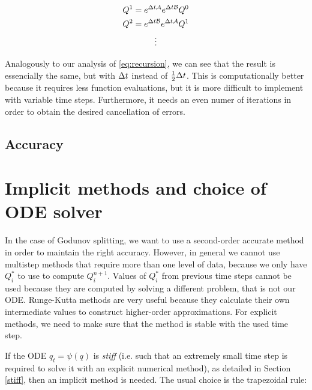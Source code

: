 \documentclass[journal,onecolumn]{IEEEtran}
\begin{document}
\begin{equation}
	\begin{gathered}
		Q^1 = e^{\Delta t\mathcal{A}}e^{\Delta t\mathcal{B}}Q^0\\
		Q^2 = e^{\Delta t\mathcal{B}}e^{\Delta t\mathcal{A}}Q^1\\
		\vdots 
	\end{gathered}
\end{equation}

Analogously to our analysis of \eqref{eq:recursion}, we can see that the result is essencially the same, but with $\Delta t$ instead of $\frac{1}{2}\Delta t$. This is computationally better because it requires less function evaluations, but it is more difficult to implement with variable time steps. Furthermore, it needs an even numer of iterations in order to obtain the desired cancellation of errors.

\subsection{Accuracy}























\section{Implicit methods and choice of ODE solver}

In the case of Godunov splitting, we want to use a second-order accurate method in order to maintain the right accuracy. However, in general we cannot use multistep methods that require more than one level of data, because we only have $Q_i^*$ to use to compute $Q_i^{n+1}$. Values of $Q_i^*$ from previous time steps cannot be used because they are computed by solving a different problem, that is not our ODE. Runge-Kutta methods are very useful because they calculate their own intermediate values to construct higher-order approximations. For explicit methods, we need to make sure that the method is stable with the used time step.

\hfill

If the ODE $q_t=\psi(q)$ is \textit{stiff} (i.e. such that an extremely small time step is required to solve it with an explicit numerical method), as detailed in Section \ref{stiff}, then an implicit method is needed. The usual choice is the trapezoidal rule:
\end{document}
